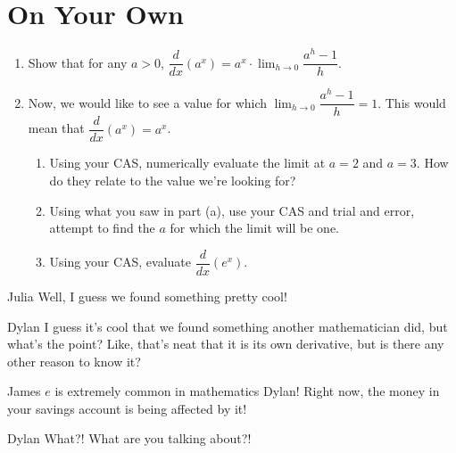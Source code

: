 \documentclass{ximera}
\begin{document}
\section{On Your Own}
\begin{enumerate}
\item Show that for any $a > 0$, $\dfrac{d}{dx}(a^x) = a^x \cdot \displaystyle \lim_{h \to 0} \dfrac{a^h-1}{h}\text{.}$
\item Now, we would like to see a value for which $\displaystyle \lim_{h \to 0} \dfrac{a^h-1}{h} = 1$. This would mean that $\dfrac{d}{dx}(a^x) = a^x$.
\begin{enumerate}
\item Using your CAS, numerically evaluate the limit at $a = 2$ and $a = 3$. How do they relate to the value we're looking for?
\item Using what you saw in part (a), use your CAS and trial and error, attempt to find the $a$ for which the limit will be one.
\item Using your CAS, evaluate $\dfrac{d}{dx}(e^x)$.
\end{enumerate}
\end{enumerate}

\begin{dialogue}
\item[Julia] Well, I guess we found something pretty cool!
\item[Dylan] I guess it's cool that we found something another mathematician did, but what's the point? Like, that's neat that it is its own derivative, but is there any other reason to know it?
\item[James] $e$ is extremely common in mathematics Dylan! Right now, the money in your savings account is being affected by it!
\item[Dylan] What?! What are you talking about?!
\end{dialogue}
\end{document}
